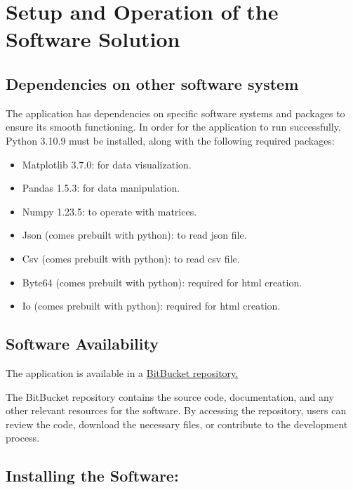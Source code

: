 \section{Setup and Operation of the Software Solution}
\subsection{Dependencies on other software system}

The application has dependencies on specific software systems and packages to ensure its smooth functioning. In order for the application to run successfully, Python 3.10.9 must be installed, along with the following required packages:

\begin{itemize}
\item Matplotlib 3.7.0: for data visualization.
\item Pandas 1.5.3: for data manipulation.
\item Numpy 1.23.5: to operate with matrices.
\item Json (comes prebuilt with python): to read json file.
\item Csv (comes prebuilt with python): to read csv file.
\item Byte64 (comes prebuilt with python): required for html creation.
\item Io (comes prebuilt with python): required for html creation.
\end{itemize}




\subsection{Software Availability}

The application is available in a \href{https://bitbucket.student.fiw.fhws.de:8443/projects/PRGPROJSS23/repos/programmierprojekt-ss-23---gruppe-99---exam-quality-control/browse}{BitBucket repository.}  

\vspace{\baselineskip}

The BitBucket repository contains the source code, documentation, and any other relevant resources for the software. By accessing the repository, users can review the code, download the necessary files, or contribute to the development process.

\subsection{Installing the Software:}

